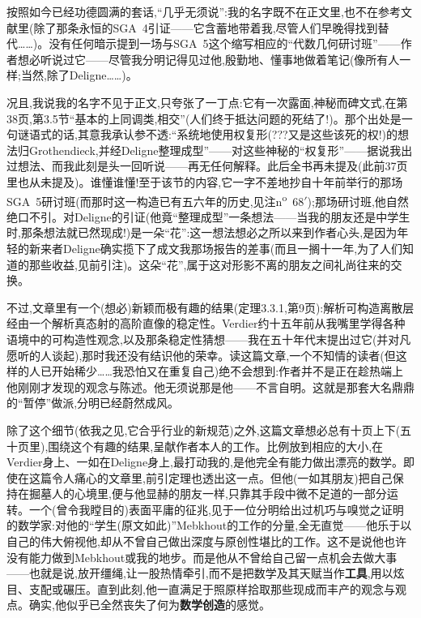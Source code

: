 按照如今已经功德圆满的套话,“几乎无须说”:我的名字既不在正文里,也不在参考文献里(除了那条永恒的SGA~4引证——它含蓄地带着我,尽管人们早晚得找到替代……)。没有任何暗示提到一场与SGA~5这个缩写相应的“代数几何研讨班”——作者想必听说过它——尽管我分明记得见过他,殷勤地、懂事地做着笔记(像所有人一样;当然,除了Deligne……)。

况且,我说我的名字不见于正文,只夸张了一丁点:它有一次露面,神秘而碑文式,在第38页,第3.5节“基本的上同调类,相交”(人们终于抵达问题的死结了!)。那个出处是一句谜语式的话,其意我承认参不透:“系统地使用权复形(???又是这些该死的权!)的想法归Grothendieck,并经Deligne整理成型”——对这些神秘的“权复形”——据说我出过想法、而我此刻是头一回听说——再无任何解释。此后全书再未提及(此前37页里也从未提及)。谁懂谁懂!至于该节的内容,它一字不差地抄自十年前举行的那场SGA~5研讨班(而那时这一构造已有五六年的历史,见注n\textsuperscript{o}~68$'$);那场研讨班,他自然绝口不引。对Deligne的引证(他竟“整理成型”一条想法——当我的朋友还是中学生时,那条想法就已然现成!)是一朵“花”:这一想法想必之所以来到作者心头,是因为年轻的新来者Deligne确实揽下了成文我那场报告的差事(而且一搁十一年,为了人们知道的那些收益,见前引注)。这朵“花”,属于这对形影不离的朋友之间礼尚往来的交换。

不过,文章里有一个(想必)新颖而极有趣的结果(定理3.3.1,第9页):解析可构造离散层经由一个解析真态射的高阶直像的稳定性。Verdier约十五年前从我嘴里学得各种语境中的可构造性观念,以及\dmark{}那条稳定性猜想——我在五十年代末提出过它(并对凡愿听的人谈起),那时我还没有结识他的荣幸。读这篇文章,一个不知情的读者(但这样的人已开始稀少……我恐怕又在重复自己)绝不会想到:作者并不是正在趁热端上他刚刚才发现的观念与陈述。他无须说那是他——不言自明。这就是那套大名鼎鼎的“暂停”做派,分明已经蔚然成风。

除了这个细节(依我之见,它合乎行业的新规范)之外,这篇文章想必总有十页上下(五十页里),围绕这个有趣的结果,呈献作者本人的工作。比例放到相应的大小,在Verdier身上、一如在Deligne身上,最打动我的,是他完全有能力做出漂亮的数学。即使在这篇令人痛心的文章里,前引定理也透出这一点。但他(一如其朋友)把自己保持在掘墓人的心境里,便与他显赫的朋友一样,只靠其手段中微不足道的一部分运转。一个(曾令我瞠目的)表面平庸的征兆,见于一位分明给出过机巧与嗅觉之证明的数学家:对他的“学生(原文如此)”Mebkhout的工作的分量,全无直觉——他乐于以自己的伟大俯视他,却从不曾自己做出深度与原创性堪比的工作。这不是说他也许没有能力做到Mebkhout或我的地步。而是他从不曾给自己留一点机会去做大事——也就是说,放开缰绳,让一股热情牵引,而不是把数学及其天赋当作\textbf{工具},用以炫目、支配或碾压。直到此刻,他一直满足于照原样拾取那些现成而丰产的观念与观点。确实,他似乎已全然丧失了何为\textbf{数学创造}的感觉。

